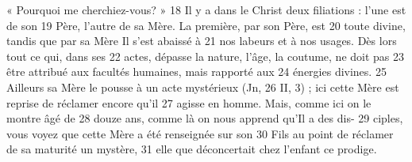 « Pourquoi me cherchiez-vous? »	 
18	 	Il y a dans le Christ deux filiations : l'une est de son	 
19	 	Père, l'autre de sa Mère. La première, par son Père, est	 
20	 	toute divine, tandis que par sa Mère Il s'est abaissé à	 
21	 	nos labeurs et à nos usages. Dès lors tout ce qui, dans ses	 
22	 	actes, dépasse la nature, l'âge, la coutume, ne doit pas	 
23	 	être attribué aux facultés humaines, mais rapporté aux	 
24	 	énergies divines.	 
25	 	Ailleurs sa Mère le pousse à un acte mystérieux (Jn,	 
26	 	II, 3) ; ici cette Mère est reprise de réclamer encore qu'il	 
27	 	agisse en homme. Mais, comme ici on le montre âgé de	 
28	 	douze ans, comme là on nous apprend qu'Il a des dis-	 
29	 	ciples, vous voyez que cette Mère a été renseignée sur son	 
30	 	Fils au point de réclamer de sa maturité un mystère,	 
31	 	elle que déconcertait chez l'enfant ce prodige.